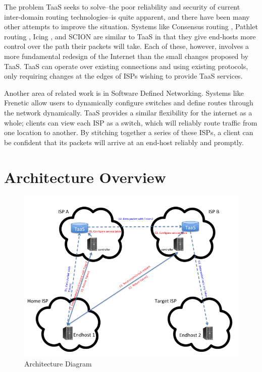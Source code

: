 \documentclass{article}
\begin{document}
The problem TaaS seeks to solve--the poor reliability and security of
current inter-domain routing technologies--is quite apparent, and
there have been many other attempts to improve the situation. Systems
like Consensus routing \cite{consensus}, Pathlet routing
\cite{pathlet}, Icing \cite{icing}, and SCION \cite{scion} are similar
to TaaS in that they give end-hosts more control over the path their
packets will take. Each of these, however, involves a more fundamental
redesign of the Internet than the small changes proposed by TaaS. TaaS
can operate over existing connections and using existing protocols,
only requiring changes at the edges of ISPs wishing to provide TaaS
services.

Another area of related work is in Software Defined
Networking. Systems like Frenetic \cite{frenetic} allow users to
dynamically configure switches and define routes through the network
dynamically. TaaS provides a similar flexibility for the internet as a
whole; clients can view each ISP as a switch, which will reliably
route traffic from one location to another. By stitching together a
series of these ISPs, a client can be confident that its packets will
arrive at an end-host reliably and promptly.

\section{Architecture Overview}
\begin{figure}
\includegraphics[width=\linewidth]{diagram}
\caption{Architecture Diagram}
\label{fig:diagram}
\end{figure}
\end{document}
